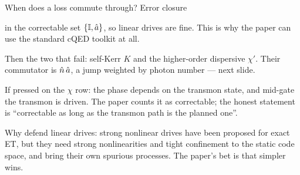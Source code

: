 \begin{frame}{When does a loss commute through? Error closure}
{\begin{ntitem}
            in the correctable set $\{\mathbb{I}, \hat{a}\}$, so linear drives are fine. This is why the
            paper can use the standard cQED toolkit at all.
      \item Then the two that fail: self-Kerr $K$ and the higher-order dispersive $\chi'$. Their
            commutator is $\hat{n}\,\hat{a}$, a jump weighted by photon number --- next slide.
      \item If pressed on the $\chi$ row: the phase depends on the transmon state, and mid-gate
            the transmon is driven. The paper counts it as correctable; the honest statement is
            ``correctable as long as the transmon path is the planned one''.
      \item Why defend linear drives: strong nonlinear drives have been proposed for exact ET,
            but they need strong nonlinearities and tight confinement to the static code space,
            and bring their own spurious processes. The paper's bet is that simpler wins.
    \end{ntitem}}
\end{frame}

